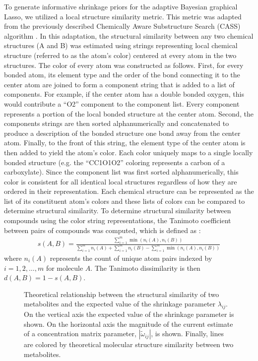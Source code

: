 \begin{DoubleSpace}
To generate informative shrinkage priors for the adaptive Bayesian graphical Lasso, we utilized a local structure similarity metric. This metric was adapted from the previously described Chemically Aware Substructure Search (CASS) algorithm \cite{mitchell2014}. In this adaptation, the structural similarity between any two chemical structures (A and B)  was estimated using strings representing local chemical structure (referred to as the atom’s color) centered at every atom in the two structures. The color of every atom was constructed as follows. First, for every bonded atom, its element type and the order of the bond connecting it to the center atom are joined to form a component string that is added to a list of components. For example, if the center atom has a double bonded oxygen, this would contribute a ``O2'' component to the component list. Every component represents a portion of the local bonded structure at the center atom. Second, the components strings are then sorted alphanumerically and concatenated to produce a description of the bonded structure one bond away from the center atom. Finally, to the front of this string, the element type of the center atom is then added to yield the atom’s color. Each color uniquely maps to a single locally bonded structure (e.g. the ``CC1O1O2'' coloring represents a carbon of a carboxylate). Since the component list was first sorted alphanumerically, this color is consistent for all identical local structures regardless of how they are ordered in their representation. Each chemical structure can be represented as the list of its constituent atom’s colors and these lists of colors can be compared to determine structural similarity. To determine structural similarity between compounds using the color string representations, the Tanimoto coefficient between pairs of compounds was computed, which is defined as \cite{chen2002}:
\begin{align}
	s(A,B)=\frac{\sum_{i=1}^m \min \left(n_i(A),n_i(B) \right)}{\sum_{i=1}^m n_i(A)+\sum_{i=1}^m n_i(B)-\sum_{i=1}^m \min \left(n_i(A),n_i(B) \right)}
\end{align}
where $n_i(A)$ represents the count of unique atom pairs indexed by $i=1,2,\hdots,m$ for molecule $A$. The Tanimoto dissimilarity is then $d(A,B)=1-s(A,B)$. 

\begin{figure}[ht]
	\caption[Theoretical relationship between the structural similarity of two metabolites and the expected value of the shrinkage parameter $\lambda_{ij}$]{\DoubleSpacing Theoretical relationship between the structural similarity of two metabolites and the expected value of the shrinkage parameter $\lambda_{ij}$. On the vertical axis the expected value of the shrinkage parameter is shown. On the horizontal axis the magnitude of the current estimate of a concentration matrix parameter, $|\tilde{\omega}_{ij}|$, is shown. Finally, lines are colored by theoretical molecular structure similarity between two metabolites. \label{fig:simShrink} }
\end{figure}


\end{DoubleSpace}
